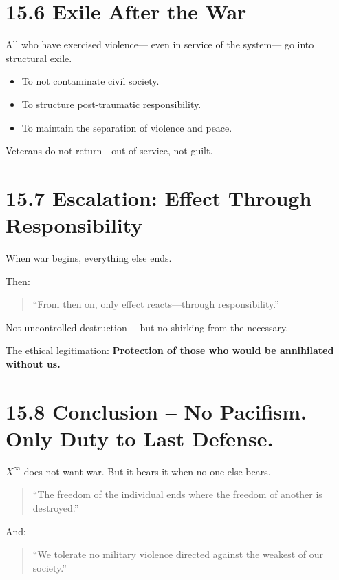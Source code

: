 \documentclass[12pt,a4paper]{book}
\begin{document}
\section*{15.6 Exile After the War}

All who have exercised violence—  
even in service of the system—  
go into structural exile.

\begin{itemize}
    \item To not contaminate civil society.
    \item To structure post-traumatic responsibility.
    \item To maintain the separation of violence and peace.
\end{itemize}

Veterans do not return—out of service, not guilt.

\section*{15.7 Escalation: Effect Through Responsibility}

When war begins,  
everything else ends.

Then:

\begin{quote}
“From then on, only effect reacts—through responsibility.”  
\end{quote}

Not uncontrolled destruction—  
but no shirking from the necessary.

The ethical legitimation:  
\textbf{Protection of those who would be annihilated without us.}

\section*{15.8 Conclusion – No Pacifism. Only Duty to Last Defense.}

$X^\infty$ does not want war.  
But it bears it when no one else bears.

\begin{quote}
“The freedom of the individual ends where  
the freedom of another is destroyed.”  
\end{quote}

And:

\begin{quote}
“We tolerate no military violence directed against the weakest of our society.”  
\end{quote}
\end{document}
